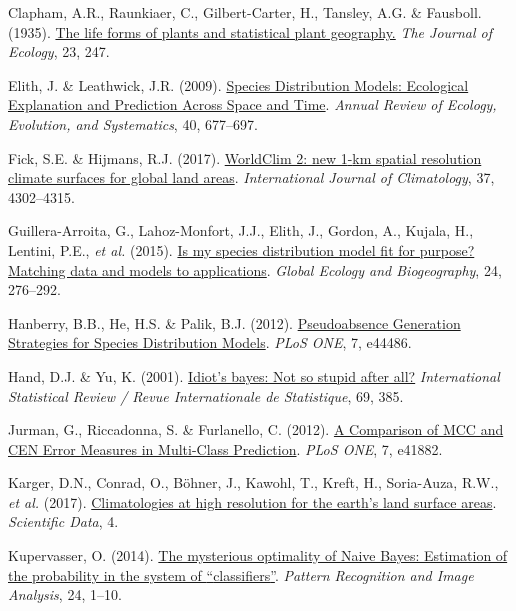 \documentclass[
  letterpaper,
]{scrbook}
\newlength{\cslhangindent}
\newenvironment{CSLReferences}[2] %
 {\begin{list}{}{%
  \setlength{\itemindent}{0pt}
  \setlength{\leftmargin}{0pt}
  \setlength{\parsep}{0pt}
  \ifodd #1
   \setlength{\leftmargin}{\cslhangindent}
   \setlength{\itemindent}{-1\cslhangindent}
  \fi
  \setlength{\itemsep}{#2\baselineskip}}}
 {\end{list}}
\begin{document}
\begin{CSLReferences}{1}{0}
Clapham, A.R., Raunkiaer, C., Gilbert-Carter, H., Tansley, A.G. \&
Fausboll. (1935). \href{https://doi.org/10.2307/2256153}{The life forms
of plants and statistical plant geography.} \emph{The Journal of
Ecology}, 23, 247.

Elith, J. \& Leathwick, J.R. (2009).
\href{https://doi.org/10.1146/annurev.ecolsys.110308.120159}{Species
Distribution Models: Ecological Explanation and Prediction Across Space
and Time}. \emph{Annual Review of Ecology, Evolution, and Systematics},
40, 677--697.

Fick, S.E. \& Hijmans, R.J. (2017).
\href{https://doi.org/10.1002/joc.5086}{WorldClim 2: new 1{-}km spatial
resolution climate surfaces for global land areas}. \emph{International
Journal of Climatology}, 37, 4302--4315.

Guillera-Arroita, G., Lahoz-Monfort, J.J., Elith, J., Gordon, A.,
Kujala, H., Lentini, P.E., \emph{et al.} (2015).
\href{https://doi.org/10.1111/geb.12268}{Is my species distribution
model fit for purpose? Matching data and models to applications}.
\emph{Global Ecology and Biogeography}, 24, 276--292.

Hanberry, B.B., He, H.S. \& Palik, B.J. (2012).
\href{https://doi.org/10.1371/journal.pone.0044486}{Pseudoabsence
Generation Strategies for Species Distribution Models}. \emph{PLoS ONE},
7, e44486.

Hand, D.J. \& Yu, K. (2001).
\href{https://doi.org/10.2307/1403452}{Idiot's bayes: Not so stupid
after all?} \emph{International Statistical Review / Revue
Internationale de Statistique}, 69, 385.

Jurman, G., Riccadonna, S. \& Furlanello, C. (2012).
\href{https://doi.org/10.1371/journal.pone.0041882}{A Comparison of MCC
and CEN Error Measures in Multi-Class Prediction}. \emph{PLoS ONE}, 7,
e41882.

Karger, D.N., Conrad, O., Böhner, J., Kawohl, T., Kreft, H., Soria-Auza,
R.W., \emph{et al.} (2017).
\href{https://doi.org/10.1038/sdata.2017.122}{Climatologies at high
resolution for the earth{'}s land surface areas}. \emph{Scientific
Data}, 4.

Kupervasser, O. (2014).
\href{https://doi.org/10.1134/s1054661814010088}{The mysterious
optimality of Naive Bayes: Estimation of the probability in the system
of {``}classifiers{''}}. \emph{Pattern Recognition and Image Analysis},
24, 1--10.


\end{CSLReferences}
\end{document}
